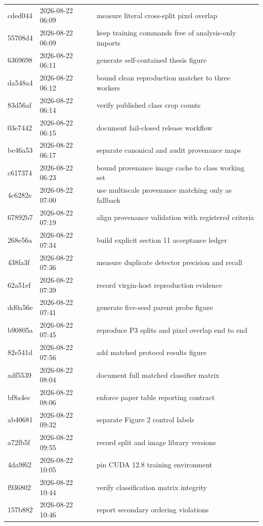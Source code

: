 {\begin{longtable}{llp{11.2cm}}
cded044 & 2026-08-22 06:09 & measure literal cross-split pixel overlap \\
55708d4 & 2026-08-22 06:09 & keep training commands free of analysis-only imports \\
6369698 & 2026-08-22 06:11 & generate self-contained thesis figure \\
da548a4 & 2026-08-22 06:12 & bound clean reproduction matcher to three workers \\
83d56af & 2026-08-22 06:14 & verify published class crop counts \\
03e7442 & 2026-08-22 06:15 & document fail-closed release workflow \\
be46a53 & 2026-08-22 06:17 & separate canonical and audit provenance maps \\
c617374 & 2026-08-22 06:23 & bound provenance image cache to class working set \\
4c6282e & 2026-08-22 07:00 & use multiscale provenance matching only as fallback \\
67892b7 & 2026-08-22 07:19 & align provenance validation with registered criteria \\
268e56a & 2026-08-22 07:34 & build explicit section 11 acceptance ledger \\
438fa3f & 2026-08-22 07:36 & measure duplicate detector precision and recall \\
62a51ef & 2026-08-22 07:39 & record virgin-host reproduction evidence \\
dd0a56e & 2026-08-22 07:41 & generate five-seed parent probe figure \\
b90805a & 2026-08-22 07:45 & reproduce P3 splits and pixel overlap end to end \\
82e541d & 2026-08-22 07:56 & add matched protocol results figure \\
adf5539 & 2026-08-22 08:04 & document full matched classifier matrix \\
bf8a4ec & 2026-08-22 08:06 & enforce paper table reporting contract \\
ab40681 & 2026-08-22 09:32 & separate Figure 2 control labels \\
a72fb5f & 2026-08-22 09:55 & record split and image library versions \\
4da9f62 & 2026-08-22 10:05 & pin CUDA 12.8 training environment \\
f936802 & 2026-08-22 10:44 & verify classification matrix integrity \\
157b882 & 2026-08-22 10:46 & report secondary ordering violations \\

\end{longtable}}
